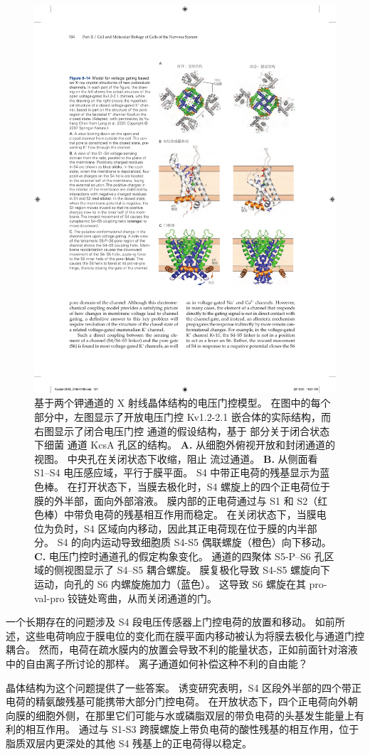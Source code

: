 \begin{figure}[htbp]
	\centering
	\includegraphics[width=0.65\linewidth]{chap08/fig_8_14}
	\caption{基于两个钾通道的 X 射线晶体结构的电压门控模型。
		在图中的每个部分中，左图显示了开放电压门控 Kv1.2-2.1 嵌合体的实际结构，而右图显示了闭合电压门控  通道的假设结构，基于 部分关于闭合状态下细菌  通道 KcsA 孔区的结构。
		\textbf{A.} 从细胞外俯视开放和封闭通道的视图。
		中央孔在关闭状态下收缩，阻止  流过通道。
		\textbf{B.} 从侧面看 S1–S4 电压感应域，平行于膜平面。
		S4 中带正电荷的残基显示为蓝色棒。
		在打开状态下，当膜去极化时，S4 螺旋上的四个正电荷位于膜的外半部，面向外部溶液。
		膜内部的正电荷通过与 S1 和 S2（红色棒）中带负电荷的残基相互作用而稳定。
		在关闭状态下，当膜电位为负时，S4 区域向内移动，因此其正电荷现在位于膜的内半部分。
		S4 的向内运动导致细胞质 S4-S5 偶联螺旋（橙色）向下移动。
		\textbf{C.} 电压门控时通道孔的假定构象变化。
		通道的四聚体 S5-P–S6 孔区域的侧视图显示了 S4–S5 耦合螺旋。
		膜复极化导致 S4-S5 螺旋向下运动，向孔的 S6 内螺旋施加力（蓝色）。
		这导致 S6 螺旋在其 pro-val-pro 铰链处弯曲，从而关闭通道的门。}
	\label{fig:8_14}
\end{figure}


一个长期存在的问题涉及 S4 段电压传感器上门控电荷的放置和移动。
如前所述，这些电荷响应于膜电位的变化而在膜平面内移动被认为将膜去极化与通道门控耦合。
然而，电荷在疏水膜内的放置会导致不利的能量状态，正如前面针对溶液中的自由离子所讨论的那样。
离子通道如何补偿这种不利的自由能？


晶体结构为这个问题提供了一些答案。
诱变研究表明，S4 区段外半部的四个带正电荷的精氨酸残基可能携带大部分门控电荷。
在开放状态下，四个正电荷向外朝向膜的细胞外侧，在那里它们可能与水或磷脂双层的带负电荷的头基发生能量上有利的相互作用。
通过与 S1-S3 跨膜螺旋上带负电荷的酸性残基的相互作用，位于脂质双层内更深处的其他 S4 残基上的正电荷得以稳定。


